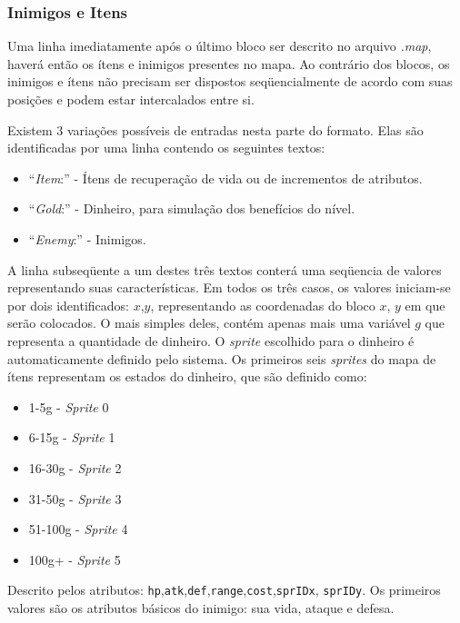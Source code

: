 \subsubsection{Inimigos e Itens}

Uma linha imediatamente após o último bloco ser descrito no arquivo \textit{.map}, haverá então os ítens e inimigos presentes no mapa.
Ao contrário dos blocos, os inimigos e ítens não precisam ser dispostos seqüencialmente de acordo com suas posições e podem estar intercalados entre si.

Existem 3 variações possíveis de entradas nesta parte do formato. Elas são identificadas por uma linha contendo os seguintes textos:
\begin{itemize}
	\item ``\textit{Item}:'' - Ítens de recuperação de vida ou de incrementos de atributos.
	\item ``\textit{Gold}:'' - Dinheiro, para simulação dos benefícios do nível.
	\item ``\textit{Enemy}:'' - Inimigos.
\end{itemize}

A linha subseqüente a um destes três textos conterá uma seqüencia de valores representando suas características. Em todos os três casos, os valores iniciam-se por dois identificados: $x$,$y$, representando as coordenadas do bloco $x$, $y$ em que serão colocados.
O mais simples deles, contém apenas mais uma variável $g$ que representa a quantidade de dinheiro. O \textit{sprite} escolhido para o dinheiro é automaticamente
definido pelo sistema. Os primeiros seis \textit{sprites} do mapa de ítens representam os estados do dinheiro, que são definido como:
\begin{itemize}
	
	\item 1-5g -    \textit{Sprite} 0
	\item 6-15g -   \textit{Sprite} 1
	\item 16-30g -  \textit{Sprite} 2
	\item 31-50g -  \textit{Sprite} 3
	\item 51-100g - \textit{Sprite} 4
	\item 100g+ -   \textit{Sprite} 5
\end{itemize}

Descrito pelos atributos: \texttt{hp},\texttt{atk},\texttt{def},\texttt{range},\texttt{cost},\texttt{sprIDx}, \texttt{sprIDy}.
Os primeiros valores são os atributos básicos do inimigo: sua vida, ataque e defesa.

